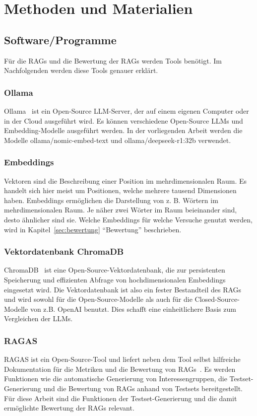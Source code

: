 \chapter{Methoden und Materialien}

\section{Software/Programme}

Für die RAGs und die Bewertung der RAGs werden Tools benötigt. Im Nachfolgenden werden diese Tools genauer erklärt.

\subsection{Ollama}
Ollama~\cite{ollama_2025} ist ein Open-Source LLM-Server, der auf einem eigenen Computer oder in der Cloud ausgeführt wird.
Es können verschiedene Open-Source LLMs und Embedding-Modelle ausgeführt werden. In der vorliegenden Arbeit werden die Modelle ollama/nomic-embed-text und ollama/deepseek-r1:32b verwendet. 

\subsection{Embeddings}
Vektoren sind die Beschreibung einer Position im mehrdimensionalen Raum. Es handelt sich hier meist um Positionen, welche mehrere tausend Dimensionen haben.
Embeddings ermöglichen die Darstellung von z. B. Wörtern im mehrdimensionalen Raum.
Je näher zwei Wörter im Raum beieinander sind, desto ähnlicher sind sie.
Welche Embeddings für welche Versuche genutzt werden, wird in Kapitel~\ref{sec:bewertung} \enquote{Bewertung} beschrieben.

\subsection{Vektordatenbank ChromaDB}
ChromaDB~\cite{trychroma_2025} ist eine Open-Source-Vektordatenbank, die zur persistenten Speicherung und effizienten Abfrage von hochdimensionalen Embeddings eingesetzt wird.
Die Vektordatenbank ist also ein fester Bestandteil des RAGs und wird sowohl für die Open-Source-Modelle als auch für die Closed-Source-Modelle von z.B. OpenAI benutzt. Dies schafft eine einheitlichere Basis zum Vergleichen der LLMs.

\subsection{RAGAS}
RAGAS ist ein Open-Source-Tool und liefert neben dem Tool selbst hilfreiche Dokumentation für die Metriken und die Bewertung von RAGs~\cite{es-etal-2024-ragas}.
Es werden Funktionen wie die automatische Generierung von Interessengruppen, die Testset-Generierung und die Bewertung von RAGs anhand von Testsets bereitgestellt.
Für diese Arbeit sind die Funktionen der Testset-Generierung und die damit ermöglichte Bewertung der RAGs relevant.

